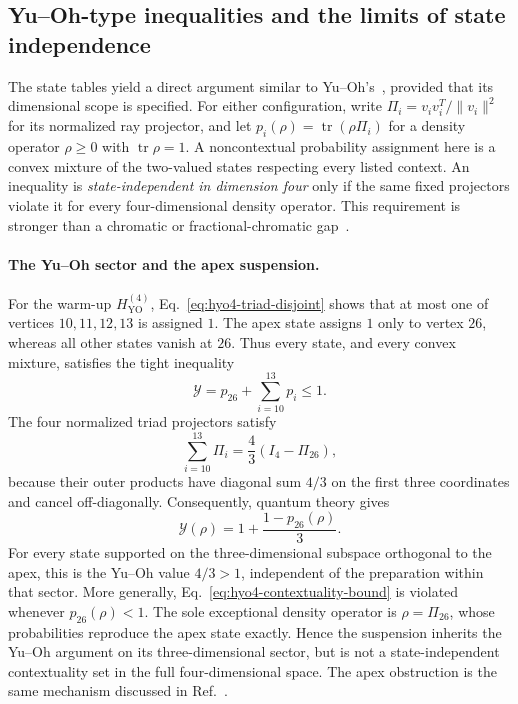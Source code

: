 \documentclass[
  aps,
  pra,
  reprint,
  superscriptaddress,
  amsmath,
  amssymb,
  nofootinbib,
  floatfix
]{revtex4-2}
\theoremstyle{definition}
\theoremstyle{remark}
\newcommand{\YO}{\mathrm{YO}}
\begin{document}
\subsection{Yu--Oh-type inequalities and the limits of state independence}\label{app:state-independence}

The state tables yield a direct argument similar to Yu--Oh's~\cite{Yu-2012}, provided that its dimensional scope is specified. For either configuration, write $\Pi_i=v_iv_i^T/\|v_i\|^2$ for its normalized ray projector, and let $p_i(\rho)=\operatorname{tr}(\rho\Pi_i)$ for a density operator $\rho\ge0$ with $\operatorname{tr}\rho=1$. A noncontextual probability assignment here is a convex mixture of the two-valued states respecting every listed context. An inequality is \emph{state-independent in dimension four} only if the same fixed projectors violate it for every four-dimensional density operator. This requirement is stronger than a chromatic or fractional-chromatic gap~\cite{cabello2015sic}.

\paragraph*{The Yu--Oh sector and the apex suspension.}
For the warm-up $H_{\YO}^{(4)}$, Eq.~\eqref{eq:hyo4-triad-disjoint} shows that at most one of vertices $10,11,12,13$ is assigned $1$. The apex state assigns $1$ only to vertex $26$, whereas all other states vanish at $26$. Thus every state, and every convex mixture, satisfies the tight inequality
\begin{equation}\label{eq:hyo4-contextuality-bound}
\mathcal{Y}=p_{26}+\sum_{i=10}^{13}p_i\le1.
\end{equation}
The four normalized triad projectors satisfy
\begin{equation}\label{eq:hyo4-contextuality-operator}
\sum_{i=10}^{13}\Pi_i=\frac43(I_4-\Pi_{26}),
\end{equation}
because their outer products have diagonal sum $4/3$ on the first three coordinates and cancel off-diagonally. Consequently, quantum theory gives
\begin{equation}\label{eq:hyo4-contextuality-gap}
\mathcal{Y}(\rho)=1+\frac{1-p_{26}(\rho)}{3}.
\end{equation}
For every state supported on the three-dimensional subspace orthogonal to the apex, this is the Yu--Oh value $4/3>1$, independent of the preparation within that sector. More generally, Eq.~\eqref{eq:hyo4-contextuality-bound} is violated whenever $p_{26}(\rho)<1$. The sole exceptional density operator is $\rho=\Pi_{26}$, whose probabilities reproduce the apex state exactly. Hence the suspension inherits the Yu--Oh argument on its three-dimensional sector, but is not a state-independent contextuality set in the full four-dimensional space. The apex obstruction is the same mechanism discussed in Ref.~\cite[Theorem~1]{cabello2015sic}.
\end{document}

